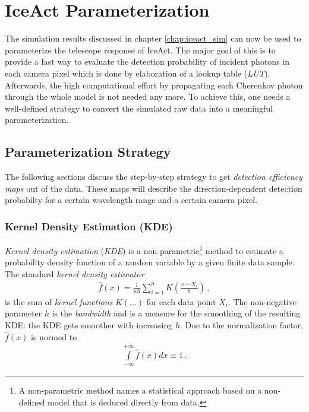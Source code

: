 \chapter{IceAct Parameterization}

The simulation results discussed in chapter \ref{chap:iceact_sim} can now be used to parameterize the telescope response of IceAct. The major goal of this is to provide a fast way to evaluate the detection probability of incident photons in each camera pixel which is done by elaboration of a lookup table (\textit{LUT}). Afterwards, the high computational effort by propagating each Cherenkov photon through the whole \geant model is not needed any more. To achieve this, one needs a well-defined strategy to convert the simulated raw data into a meaningful parameterization. 

\section{Parameterization Strategy}

The following sections discuss the step-by-step strategy to get \textit{detection efficiency maps} out of the \geant data. These maps will describe the direction-dependent detection probabilty for a certain wavelength range and a certain camera pixel.

\subsection{Kernel Density Estimation (KDE)}

\textit{Kernel density estimation} (\textit{KDE}) is a non-parametric\footnote{A non-parametric method names a statistical approach based on a non-defined model that is deduced directly from data.} method to estimate a probability density function of a random variable by a given finite data sample. The standard \textit{kernel density estimator}
\begin{align}
	\hat{f}(x)=\frac{1}{nh}\sum_{i=1}^{n}K\left(\frac{x-X_i}{h}\right)\,,
	\label{eq:kde}
\end{align}
is the sum of \textit{kernel functions} $K(\dots)$ for each data point $X_i$. The non-negative parameter $h$ is the \textit{bandwidth} and is a measure for the smoothing of the resulting KDE: the KDE gets smoother with increasing $h$. Due to the normalization factor, $\hat{f}(x)$ is normed to
\begin{align}
	\int\limits_{-\infty}^{+\infty}\hat{f}(x)dx \equiv 1\,.
	\label{kde:norm}
\end{align}


